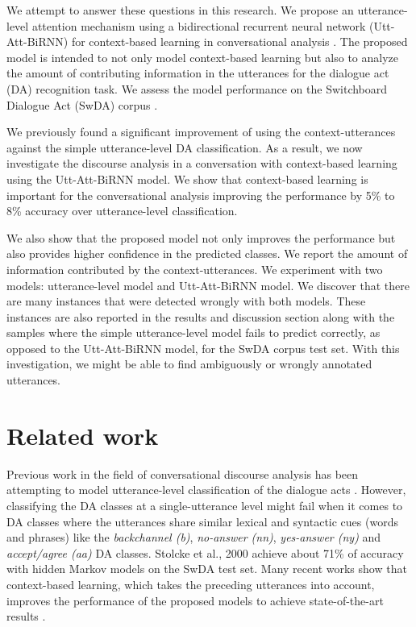 \documentclass[a4paper]{article}
\begin{document}
We attempt to answer these questions in this research. 
We propose an utterance-level attention mechanism using a bidirectional recurrent neural network (Utt-Att-BiRNN) for context-based learning in conversational analysis \cite{GravesBiRnn,SchusterBiRnn,bahdanau2014neural,zhou2016attention}. 
The proposed model is intended to not only model context-based learning but also to analyze the amount of contributing information in the utterances for the dialogue act (DA) recognition task. 
We assess the model performance on the Switchboard Dialogue Act (SwDA) corpus \cite{godfrey1992switchboard}. 

We previously found a significant improvement of using the context-utterances against the simple utterance-level DA classification.
As a result, we now investigate the discourse analysis in a conversation with context-based learning using the Utt-Att-BiRNN model.
We show that context-based learning is important for the conversational analysis improving the performance by 5\% to 8\% accuracy over utterance-level classification.

We also show that the proposed model not only improves the performance but also provides higher confidence in the predicted classes. 
We report the amount of information contributed by the context-utterances.
We experiment with two models: utterance-level model and Utt-Att-BiRNN model.
We discover that there are many instances that were detected wrongly with both models.
These instances are also reported in the results and discussion section along with the samples where the simple utterance-level model fails to predict correctly, as opposed to the Utt-Att-BiRNN model, for the SwDA corpus test set.
With this investigation, we might be able to find ambiguously or wrongly annotated utterances.


\section{Related work}

Previous work in the field of conversational discourse analysis has been attempting to model utterance-level classification of the dialogue acts \cite{stolcke2000dialogue,grau2004dialogue,tavafi2013dialogue,khanpour2016dialogue}. 
However, classifying the DA classes at a single-utterance level might fail when it comes to DA classes where the utterances share similar lexical and syntactic cues (words and phrases) like the \textit{backchannel (b)}, \textit{no-answer (nn)}, \textit{yes-answer (ny)} and \textit{accept/agree (aa)} DA classes. Stolcke et al., 2000 \cite{stolcke2000dialogue} achieve about 71\% of accuracy with hidden Markov models on the SwDA test set.
Many recent works show that context-based learning, which takes the preceding utterances into account, improves the performance of the proposed models to achieve state-of-the-art results \cite{sridhar2008modeling,kalchbrenner2013recurrent,ji2016latent,kumar2017dasl,tzh2017EMNLP,ltAl2017EMNLP,ortega2017neural,Meng2017,lee2016sequential,BOTHE18_525}. 
\end{document}
